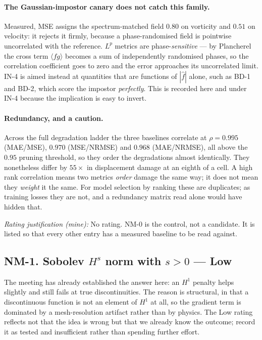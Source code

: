 \documentclass[11pt]{article}
\newcommand{\Low}{\textbf{Low}}
\newcommand{\rating}[1]{\par\smallskip\noindent\textit{Rating justification (mine):} #1}
\begin{document}
\paragraph{The Gaussian-impostor canary does not catch this family.} Measured, MSE assigns
the spectrum-matched field $0.80$ on vorticity and $0.51$ on velocity: it rejects it firmly,
because a phase-randomised field is pointwise uncorrelated with the reference. $L^p$ metrics
are phase-\emph{sensitive} --- by Plancherel the cross term $\langle fg\rangle$ becomes a sum
of independently randomised phases, so the correlation coefficient goes to zero and the error
approaches its uncorrelated limit. IN-4 is aimed instead at quantities that are functions of
$|\hat f|$ alone, such as BD-1 and BD-2, which score the impostor \emph{perfectly}. This is
recorded here and under IN-4 because the implication is easy to invert.

\paragraph{Redundancy, and a caution.} Across the full degradation ladder the three
baselines correlate at $\rho = 0.995$ (MAE/MSE), $0.970$ (MSE/NRMSE) and $0.968$
(MAE/NRMSE), all above the $0.95$ pruning threshold, so they order the degradations almost
identically. They nonetheless differ by $55\times$ in displacement damage at an eighth of a
cell. A high rank correlation means two metrics \emph{order} damage the same way; it does not
mean they \emph{weight} it the same. For model selection by ranking these are duplicates; as
training losses they are not, and a redundancy matrix read alone would have hidden that.

\rating{No rating. NM-0 is the control, not a candidate. It is listed so that every other
entry has a measured baseline to be read against.}

\subsection{NM-1. Sobolev $H^s$ norm with $s>0$ --- \Low{}}

The meeting has already established the answer here: an $H^1$ penalty helps slightly and
still fails at true discontinuities. The reason is structural, in that a discontinuous
function is not an element of $H^1$ at all, so the gradient term is dominated by a
mesh-resolution artifact rather than by physics. The Low rating reflects not that the idea
is wrong but that we already know the outcome; record it as tested and insufficient rather
than spending further effort.
\end{document}
